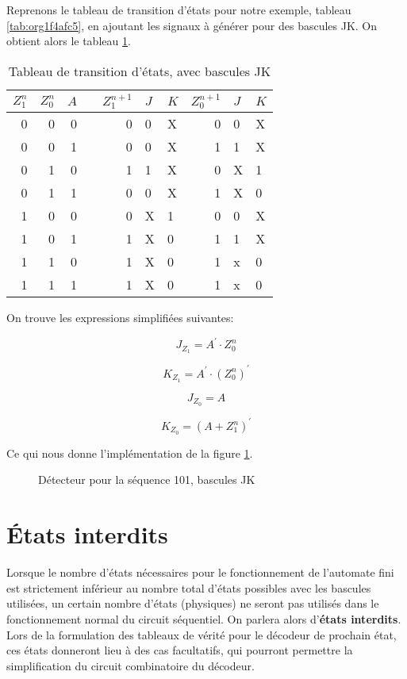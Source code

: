 \documentclass[letter, oneside]{book}
\begin{document}
\begin{enumerate}
Reprenons le tableau de transition d'états pour notre exemple, tableau
\ref{tab:org1f4afc5}, en ajoutant les signaux à générer pour des
bascules JK. On obtient alors le tableau \ref{tab:orgd5d4069}.

\begin{table}[htbp]
\caption{\label{tab:orgd5d4069}Tableau de transition d'états, avec bascules JK}
\centering
\begin{tabular}{rrrlrllrll}
\(Z_1^n\) & \(Z_0^n\) & \(A\) &  & \(Z_1^{n+1}\) & \(J\) & \(K\) & \(Z_0^{n+1}\) & \(J\) & \(K\)\\[0pt]
\hline
0 & 0 & 0 &  & 0 & 0 & X & 0 & 0 & X\\[0pt]
0 & 0 & 1 &  & 0 & 0 & X & 1 & 1 & X\\[0pt]
0 & 1 & 0 &  & 1 & 1 & X & 0 & X & 1\\[0pt]
0 & 1 & 1 &  & 0 & 0 & X & 1 & X & 0\\[0pt]
1 & 0 & 0 &  & 0 & X & 1 & 0 & 0 & X\\[0pt]
1 & 0 & 1 &  & 1 & X & 0 & 1 & 1 & X\\[0pt]
1 & 1 & 0 &  & 1 & X & 0 & 1 & x & 0\\[0pt]
1 & 1 & 1 &  & 1 & X & 0 & 1 & x & 0\\[0pt]
\end{tabular}
\end{table}

On trouve les expressions simplifiées suivantes:

$$ J_{Z_1} = A^\prime \cdot Z_0^n $$

$$ K_{Z_1} = A^\prime \cdot (Z_0^n)^\prime $$

$$ J_{Z_0} = A $$ 

$$ K_{Z_0} = (A + Z_1^n)^\prime $$

Ce qui nous donne l'implémentation de la figure \ref{fig:orga54fbec}.

\begin{figure}[htbp]
\centering

\caption{\label{fig:orga54fbec}Détecteur pour la séquence 101, bascules JK}
\end{figure}
\end{enumerate}

\section{États interdits}
\label{sec:org68fe644}

Lorsque le nombre d'états nécessaires pour le fonctionnement de
l'automate fini est strictement inférieur au nombre total d'états
possibles avec les bascules utilisées, un certain nombre d'états
(physiques) ne seront pas utilisés dans le fonctionnement normal du
circuit séquentiel. On parlera alors d'\textbf{états interdits}.  Lors de la
formulation des tableaux de vérité pour le décodeur de prochain état,
ces états donneront lieu à des cas facultatifs, qui pourront permettre
la simplification du circuit combinatoire du décodeur.
\end{document}
